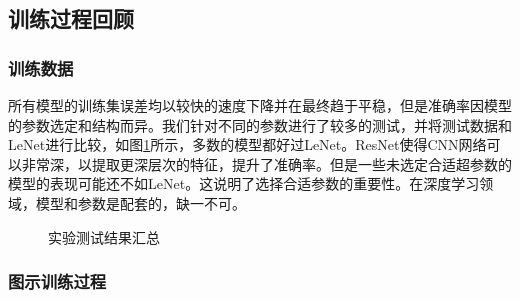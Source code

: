 \documentclass[hyperref, UTF8, 12pt]{article}
\theoremstyle{definition}
\begin{document}
\subsection{训练过程回顾}

\subsubsection{训练数据}
所有模型的训练集误差均以较快的速度下降并在最终趋于平稳，但是准确率因模型的参数选定和结构而异。我们针对不同的参数进行了较多的测试，并将测试数据和LeNet进行比较，如图\ref{fig:total}所示，多数的模型都好过LeNet。ResNet使得CNN网络可以非常深，以提取更深层次的特征，提升了准确率。但是一些未选定合适超参数的模型的表现可能还不如LeNet。这说明了选择合适参数的重要性。在深度学习领域，模型和参数是配套的，缺一不可。
\begin{figure}[H]
	\centering
	\caption{实验测试结果汇总}
	\label{fig:total}
\end{figure}

\subsubsection{图示训练过程}
\end{document}
